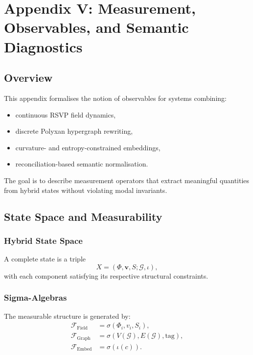 \chapter*{Appendix V: Measurement, Observables, and Semantic Diagnostics}

\section{Overview}

This appendix formalises the notion of observables for systems combining:
\begin{itemize}
\item continuous RSVP field dynamics,
\item discrete Polyxan hypergraph rewriting,
\item curvature- and entropy-constrained embeddings,
\item reconciliation-based semantic normalisation.
\end{itemize}

The goal is to describe measurement operators that extract meaningful quantities from hybrid states without violating modal invariants.

\section{State Space and Measurability}

\subsection{Hybrid State Space}

A complete state is a triple
\[
X = (\Phi, \mathbf{v}, S; \mathcal{G}, \iota),
\]
with each component satisfying its respective structural constraints.

\subsection{Sigma-Algebras}

The measurable structure is generated by:
\begin{align*}
\mathcal{F}_{\mathrm{Field}} &= \sigma(\Phi_i, v_i, S_i), \\
\mathcal{F}_{\mathrm{Graph}} &= \sigma(V(\mathcal{G}), E(\mathcal{G}), \mathrm{tag}), \\
\mathcal{F}_{\mathrm{Embed}} &= \sigma(\iota(c)).
\end{align*}

